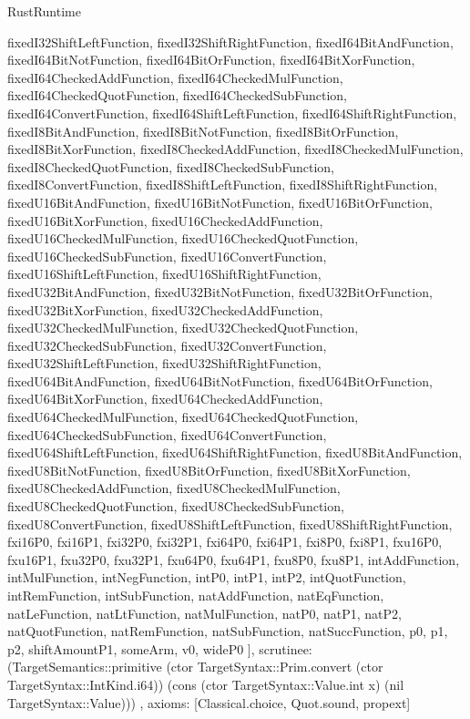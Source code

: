 \begin{lexlean}{RustRuntime}
\begin{semanticmodule}
{{      fixedI32ShiftLeftFunction,
      fixedI32ShiftRightFunction,
      fixedI64BitAndFunction,
      fixedI64BitNotFunction,
      fixedI64BitOrFunction,
      fixedI64BitXorFunction,
      fixedI64CheckedAddFunction,
      fixedI64CheckedMulFunction,
      fixedI64CheckedQuotFunction,
      fixedI64CheckedSubFunction,
      fixedI64ConvertFunction,
      fixedI64ShiftLeftFunction,
      fixedI64ShiftRightFunction,
      fixedI8BitAndFunction,
      fixedI8BitNotFunction,
      fixedI8BitOrFunction,
      fixedI8BitXorFunction,
      fixedI8CheckedAddFunction,
      fixedI8CheckedMulFunction,
      fixedI8CheckedQuotFunction,
      fixedI8CheckedSubFunction,
      fixedI8ConvertFunction,
      fixedI8ShiftLeftFunction,
      fixedI8ShiftRightFunction,
      fixedU16BitAndFunction,
      fixedU16BitNotFunction,
      fixedU16BitOrFunction,
      fixedU16BitXorFunction,
      fixedU16CheckedAddFunction,
      fixedU16CheckedMulFunction,
      fixedU16CheckedQuotFunction,
      fixedU16CheckedSubFunction,
      fixedU16ConvertFunction,
      fixedU16ShiftLeftFunction,
      fixedU16ShiftRightFunction,
      fixedU32BitAndFunction,
      fixedU32BitNotFunction,
      fixedU32BitOrFunction,
      fixedU32BitXorFunction,
      fixedU32CheckedAddFunction,
      fixedU32CheckedMulFunction,
      fixedU32CheckedQuotFunction,
      fixedU32CheckedSubFunction,
      fixedU32ConvertFunction,
      fixedU32ShiftLeftFunction,
      fixedU32ShiftRightFunction,
      fixedU64BitAndFunction,
      fixedU64BitNotFunction,
      fixedU64BitOrFunction,
      fixedU64BitXorFunction,
      fixedU64CheckedAddFunction,
      fixedU64CheckedMulFunction,
      fixedU64CheckedQuotFunction,
      fixedU64CheckedSubFunction,
      fixedU64ConvertFunction,
      fixedU64ShiftLeftFunction,
      fixedU64ShiftRightFunction,
      fixedU8BitAndFunction,
      fixedU8BitNotFunction,
      fixedU8BitOrFunction,
      fixedU8BitXorFunction,
      fixedU8CheckedAddFunction,
      fixedU8CheckedMulFunction,
      fixedU8CheckedQuotFunction,
      fixedU8CheckedSubFunction,
      fixedU8ConvertFunction,
      fixedU8ShiftLeftFunction,
      fixedU8ShiftRightFunction,
      fxi16P0,
      fxi16P1,
      fxi32P0,
      fxi32P1,
      fxi64P0,
      fxi64P1,
      fxi8P0,
      fxi8P1,
      fxu16P0,
      fxu16P1,
      fxu32P0,
      fxu32P1,
      fxu64P0,
      fxu64P1,
      fxu8P0,
      fxu8P1,
      intAddFunction,
      intMulFunction,
      intNegFunction,
      intP0,
      intP1,
      intP2,
      intQuotFunction,
      intRemFunction,
      intSubFunction,
      natAddFunction,
      natEqFunction,
      natLeFunction,
      natLtFunction,
      natMulFunction,
      natP0,
      natP1,
      natP2,
      natQuotFunction,
      natRemFunction,
      natSubFunction,
      natSuccFunction,
      p0,
      p1,
      p2,
      shiftAmountP1,
      someArm,
      v0,
      wideP0
    ],
    scrutinee: (TargetSemantics::primitive (ctor TargetSyntax::Prim.convert (ctor TargetSyntax::IntKind.i64)) (cons (ctor TargetSyntax::Value.int x) (nil TargetSyntax::Value)))
  },
  axioms: [Classical.choice, Quot.sound, propext]
}


\end{semanticmodule}
\end{lexlean}
